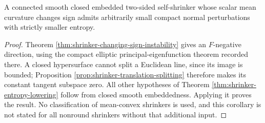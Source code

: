\begin{corollary}\label{cor:closed-shrinker-entropy-drop}
A connected smooth closed embedded two-sided self-shrinker whose scalar mean curvature changes sign admits arbitrarily small compact normal perturbations with strictly smaller entropy.
\end{corollary}
\begin{proof}
Theorem \ref{thm:shrinker-changing-sign-instability} gives an $F$-negative direction, using the compact elliptic principal-eigenfunction theorem recorded there. A closed hypersurface cannot split a Euclidean line, since its image is bounded; Proposition \ref{prop:shrinker-translation-splitting} therefore makes its constant tangent subspace zero. All other hypotheses of Theorem \ref{thm:shrinker-entropy-lowering} follow from closed smooth embeddedness. Applying it proves the result. No classification of mean-convex shrinkers is used, and this corollary is not stated for all nonround shrinkers without that additional input.
\end{proof}
